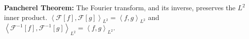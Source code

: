 {\bf Pancherel Theorem:} The Fourier transform, and its inverse, preserves the $L^2$ inner product. $\left\langle\mathcal{F}[f],\mathcal{F}[g]\right\rangle_{L^2}=\left\langle f,g\right\rangle_{L^2}$ and $\left\langle\mathcal{F}^{-1}[f],\mathcal{F}^{-1}[g]\right\rangle_{L^2}=\left\langle f,g\right\rangle_{L^2}$.